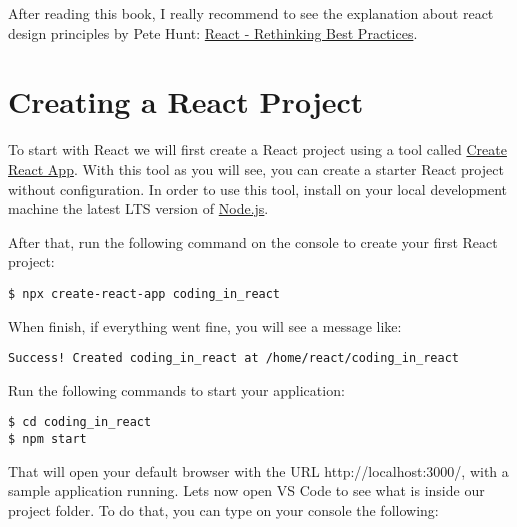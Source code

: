 \documentclass[a4paper, oneside, titlepage, 12pt]{book}
\begin{document}
After reading this book, I really recommend to see the explanation about react design principles by Pete Hunt: \href{https://www.youtube.com/watch?v=DgVS-zXgMTk}{React - Rethinking Best Practices}.



\section{Creating a React Project} \label{create_react_project}

To start with React we will first create a React project using a tool called \href{https://github.com/facebook/create-react-app}{Create React App}. With this tool as you will see, you can create a starter React project without configuration. In order to use this tool, install on your local development machine the latest LTS version of \href{https://nodejs.org/}{Node.js}.

After that, run the following command on the console to create your first React project:

\begin{verbatim}
$ npx create-react-app coding_in_react
\end{verbatim}

When finish, if everything went fine, you will see a message like:

\begin{verbatim}
Success! Created coding_in_react at /home/react/coding_in_react
\end{verbatim}

Run the following commands to start your application:

\begin{verbatim}
$ cd coding_in_react
$ npm start
\end{verbatim}

That will open your default browser with the URL http://localhost:3000/, with a sample application running. Lets now open VS Code to see what is inside our project folder. To do that, you can type on your console the following: 
\end{document}
